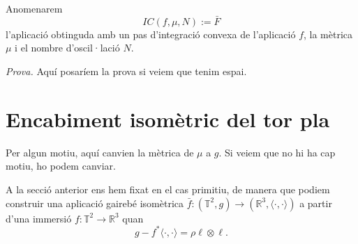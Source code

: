 \begin{nota}
    Anomenarem 
    \begin{equation*}
        IC(f,\mu,N):=\bar F
    \end{equation*}
    l'aplicació obtinguda amb un pas d'integració convexa de l'aplicació $f$, la mètrica $\mu$ i el nombre d'oscil·lació $N$.
\end{nota}
{
\color{green!50!black}
\textit{Prova.} Aquí posaríem la prova si veiem que tenim espai.
}
\section{Encabiment isomètric del tor pla}
{
\color{blue} Per algun motiu, aquí canvien la mètrica de $\mu$ a $g$. Si veiem que no hi ha cap motiu, ho podem canviar.
}

A la secció anterior ens hem fixat en el cas primitiu, de manera que podiem construir una aplicació gairebé isomètrica $\bar f:(\mathbb T^2, g)\to(\mathbb R^3, \langle\cdot, \cdot\rangle)$ a partir d'una immersió $f:\mathbb T^2\to\mathbb R^3$ quan
\begin{equation*}
    g - f^*\langle\cdot, \cdot\rangle = \rho\ell\otimes\ell.
\end{equation*}

